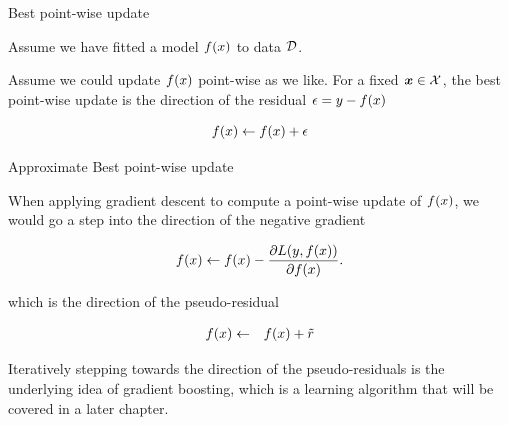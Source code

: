 \begin{frame}[t]{Best point-wise update}

Assume we have fitted a model $f(x)$ to data $\mathcal{D}$. 

\lz 

Assume we could update $f(x)$ point-wise as we like. For a fixed $\bm{x} \in \mathcal{X}$, the best point-wise update is the direction of the residual $\epsilon = y - f(x)$

$$
	f(x) \leftarrow f(x) + \epsilon 
$$


\begin{overlayarea}{\textwidth}{\textheight}
\begin{center}
\end{center}
\end{overlayarea} 

\end{frame}

\begin{vbframe}{Approximate Best point-wise update}

When applying gradient descent to compute a point-wise update of $f(x)$, we would go a step into the direction of the negative gradient

$$
	f(x) \leftarrow f(x) - \frac{\partial L(y, f(x))}{\partial f(x)}. 
$$

which is the direction of the pseudo-residual

\begin{eqnarray*}
	f(x) &\leftarrow& f(x) + \tilde r\\ 
\end{eqnarray*}

Iteratively stepping towards the direction of the pseudo-residuals is the underlying idea of gradient boosting, which is a learning algorithm that will be covered in a later chapter. 


\end{vbframe}


